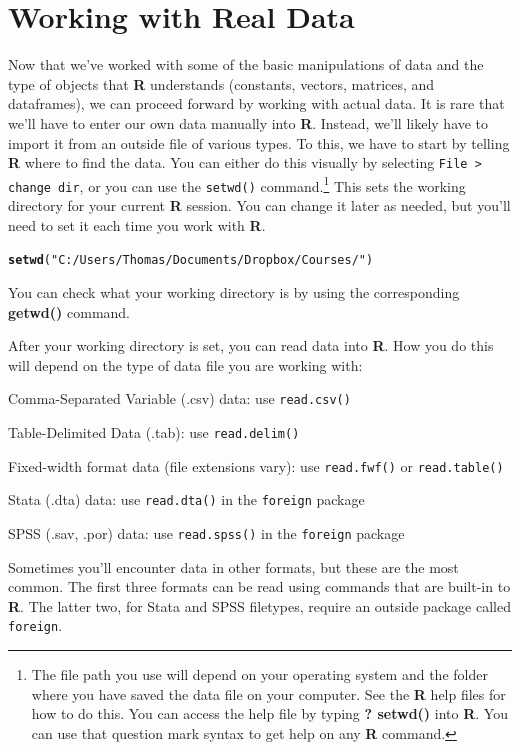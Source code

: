 \documentclass[12pt]{article}\usepackage[]{graphicx}\usepackage[]{color}
\makeatletter
\newcommand{\hlstr}[1]{\textcolor[rgb]{0.192,0.494,0.8}{#1}}%
\newcommand{\hlstd}[1]{\textcolor[rgb]{0.345,0.345,0.345}{#1}}%
\newcommand{\hlkwd}[1]{\textcolor[rgb]{0.737,0.353,0.396}{\textbf{#1}}}%
\newenvironment{kframe}{%
 \def\at@end@of@kframe{}%
 \ifinner\ifhmode%
  \def\at@end@of@kframe{\end{minipage}}%
  \begin{minipage}{\columnwidth}%
 \fi\fi%
 \def\FrameCommand##1{\hskip\@totalleftmargin \hskip-\fboxsep
 \colorbox{shadecolor}{##1}\hskip-\fboxsep
     \hskip-\linewidth \hskip-\@totalleftmargin \hskip\columnwidth}%
 \MakeFramed {\advance\hsize-\width
   \@totalleftmargin\z@ \linewidth\hsize
   \@setminipage}}%
 {\par\unskip\endMakeFramed%
 \at@end@of@kframe}
\newenvironment{knitrout}{}{} %
\makeatother
\begin{document}
\section{Working with Real Data}\label{sec:data}
Now that we've worked with some of the basic manipulations of data and the type of objects that \textbf{R} understands (constants, vectors, matrices, and dataframes), we can proceed forward by working with actual data. It is rare that we'll have to enter our own data manually into \textbf{R}. Instead, we'll likely have to import it from an outside file of various types. To this, we have to start by telling \textbf{R} where to find the data. You can either do this visually by selecting \verb|File > change dir|, or you can use the \verb|setwd()| command.\footnote{The file path you use will depend on your operating system and the folder where you have saved the data file on your computer. See the \textbf{R} help files for how to do this. You can access the help file by typing \textbf{? setwd()} into \textbf{R}. You can use that question mark syntax to get help on any \textbf{R} command.} This sets the working directory for your current \textbf{R} session. You can change it later as needed, but you'll need to set it each time you work with \textbf{R}.
\begin{knitrout}
\color{fgcolor}\begin{kframe}
\begin{alltt}
\hlkwd{setwd}\hlstd{(}\hlstr{"C:/Users/Thomas/Documents/Dropbox/Courses/"}\hlstd{)}
\end{alltt}
\end{kframe}
\end{knitrout}

You can check what your working directory is by using the corresponding \textbf{getwd()} command.

After your working directory is set, you can read data into \textbf{R}.  How you do this will depend on the type of data file you are working with:
\begin{itemize*}
\item Comma-Separated Variable (.csv) data: use \verb|read.csv()|
\item Table-Delimited Data (.tab): use \verb|read.delim()|
\item Fixed-width format data (file extensions vary): use \verb|read.fwf()| or \verb|read.table()|
\item Stata (.dta) data: use \verb|read.dta()| in the \verb|foreign| package
\item SPSS (.sav, .por) data: use \verb|read.spss()| in the \verb|foreign| package
\end{itemize*}
Sometimes you'll encounter data in other formats, but these are the most common. The first three formats can be read using commands that are built-in to \textbf{R}. The latter two, for Stata and SPSS filetypes, require an outside package called \verb|foreign|.
\end{document}
